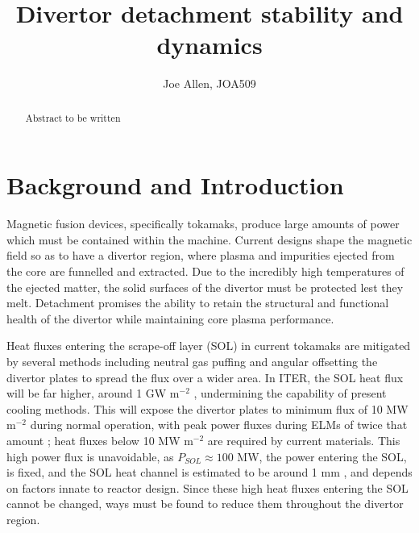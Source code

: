 \documentclass[12pt]{article}  %
\providecommand{\pow}[1]{{$^{#1}$}} %
\begin{document}
\title{Divertor detachment stability and dynamics}
\author{Joe Allen, JOA509}

    \maketitle
    \begin{abstract}
\noindent Abstract to be written
	\end{abstract}


\section{Background and Introduction}\label{secBg}
Magnetic fusion devices, specifically tokamaks, produce large amounts of power which must be contained within the machine. Current designs shape the magnetic field so as to have a divertor region, where plasma and impurities ejected from the core are funnelled and extracted. Due to the incredibly high temperatures of the ejected matter, the solid surfaces of the divertor must be protected lest they melt. Detachment promises the ability to retain the structural and functional health of the divertor while maintaining core plasma performance.

Heat fluxes entering the scrape-off layer (SOL) in current tokamaks are mitigated by several methods including neutral gas puffing and angular offsetting the divertor plates to spread the flux over a wider area. In ITER, the SOL heat flux will be far higher, around 1 GW m\pow{-2} \cite{Loarte2007}, undermining the capability of present cooling methods. This will expose the divertor plates to minimum flux of 10 MW m\pow{-2} during normal operation, with peak power fluxes during ELMs of twice that amount \cite{Loarte2007}; heat fluxes below 10 MW m\pow{-2} are required by current materials. This high power flux is unavoidable, as $ P_{SOL} \approx 100$ MW, the power entering the SOL, is fixed, and the SOL heat channel is estimated to be around 1 mm \cite{Eich2013}, and depends on factors innate to reactor design. Since these high heat fluxes entering the SOL cannot be changed, ways must be found to reduce them throughout the divertor region.
\end{document}
